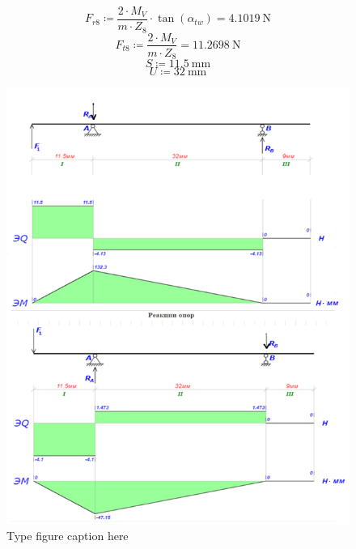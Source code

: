 \documentclass{article}
\newcommand{\defeq}{\coloneq} %
\begin{document}
\begin{equation*}
\textit{F}_{\textit{r8}} \defeq \frac{2 \cdot M_{V}}{m \cdot \textit{Z}_{\textit{8}}} \cdot \tan \left( α_{tw} \right) = {4.1019 \: \mathrm{N}}
\end{equation*}
\begin{equation*}
\textit{F}_{\textit{t8}} \defeq \frac{2 \cdot M_{V}}{m \cdot \textit{Z}_{\textit{8}}} = {11.2698 \: \mathrm{N}}
\end{equation*}
\begin{equation*}
S \defeq 11.5 \: \mathrm{mm}
\end{equation*}
\begin{equation*}
U \defeq 32 \: \mathrm{mm}
\end{equation*}
\begin{figure}[h!]
 \begin{center}
  \includegraphics[max width=\textwidth]{calculations/500.png}
  \caption{Type figure caption here}
  \label{fig:500}
 \end{center}
\end{figure}
\end{document}

